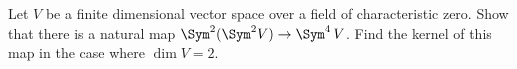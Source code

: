\begin{problem}
Let $V$ be a finite dimensional vector space over a field of characteristic zero. Show that there is a natural map $\Sym^2(\Sym^2 V) \to \Sym^4\,V$. Find the kernel of this map in the case where $\dim V = 2$.
\end{problem}